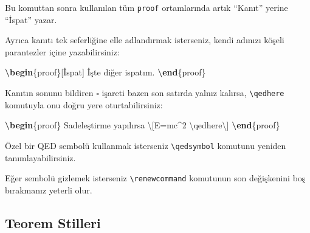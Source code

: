 \documentclass[
  10pt,
]{scrbook}
\newenvironment{Shaded}{\begin{snugshade}}{\end{snugshade}}
\newcommand{\ExtensionTok}[1]{#1}
\newcommand{\FunctionTok}[1]{\textcolor[rgb]{0.00,0.00,0.00}{#1}}
\newcommand{\KeywordTok}[1]{\textcolor[rgb]{0.13,0.29,0.53}{\textbf{#1}}}
\newcommand{\NormalTok}[1]{#1}
\newcommand{\SpecialCharTok}[1]{\textcolor[rgb]{0.00,0.00,0.00}{#1}}
\newcommand{\SpecialStringTok}[1]{\textcolor[rgb]{0.31,0.60,0.02}{#1}}
\theoremstyle{definition}
\theoremstyle{definition}
\theoremstyle{definition}
\theoremstyle{definition}
\theoremstyle{remark}
\begin{document}
Bu komuttan sonra kullanılan tüm \texttt{proof} ortamlarında artık ``Kanıt'' yerine ``İspat'' yazar.

Ayrıca kanıtı tek seferliğine elle adlandırmak isterseniz, kendi adınızı köşeli parantezler içine yazabilirsiniz:

\begin{Shaded}
\begin{Highlighting}[]
\KeywordTok{\textbackslash{}begin}\NormalTok{\{}\ExtensionTok{proof}\NormalTok{\}[İspat]}
\NormalTok{ İşte diğer ispatım.}
\KeywordTok{\textbackslash{}end}\NormalTok{\{}\ExtensionTok{proof}\NormalTok{\}}
\end{Highlighting}
\end{Shaded}

Kanıtın sonunu bildiren \(\square\) işareti bazen son satırda yalnız kalırsa, \texttt{\textbackslash{}qedhere} komutuyla onu doğru yere oturtabilirsiniz:

\begin{Shaded}
\begin{Highlighting}[]
\KeywordTok{\textbackslash{}begin}\NormalTok{\{}\ExtensionTok{proof}\NormalTok{\}}
\NormalTok{ Sadeleştirme yapılırsa }\SpecialStringTok{\textbackslash{}[E=mc\^{}2 }\SpecialCharTok{\textbackslash{}qedhere}\SpecialStringTok{\textbackslash{}]}
\KeywordTok{\textbackslash{}end}\NormalTok{\{}\ExtensionTok{proof}\NormalTok{\}}
\end{Highlighting}
\end{Shaded}

Özel bir QED sembolü kullanmak isterseniz \texttt{\textbackslash{}qedsymbol} komutunu yeniden tanımlayabilirsiniz.

\begin{Shaded}
\end{Shaded}

Eğer sembolü gizlemek isterseniz \texttt{\textbackslash{}renewcommand} komutunun son değişkenini boş bırakmanız yeterli olur.

\hypertarget{teorem-stilleri}{%
\subsection{Teorem Stilleri}\label{teorem-stilleri}}
\end{document}
